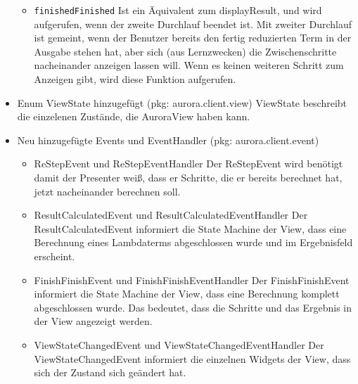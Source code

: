 \documentclass[parskip=full,11pt,twoside]{scrartcl}
\begin{document}
\begin{itemize}
\begin{itemize}
            \item \texttt{finishedFinished} Ist ein Äquivalent zum displayResult, und wird aufgerufen, wenn der zweite Durchlauf beendet ist. Mit zweiter Durchlauf ist gemeint, wenn der Benutzer bereits den fertig reduzierten Term in der Ausgabe stehen hat, aber sich (aus Lernzwecken) die Zwischenschritte nacheinander anzeigen lassen will. Wenn es keinen weiteren Schritt zum Anzeigen gibt, wird diese Funktion aufgerufen.
    	\end{itemize}
    	 \item Enum ViewState hinzugefügt (pkg: aurora.client.view)
    \newline
    ViewState beschreibt die einzelenen Zustände, die AuroraView haben kann.

    \item Neu hinzugefügte Events und EventHandler (pkg: aurora.client.event)
	\begin{itemize}
    		\item ReStepEvent und ReStepEventHandler
    		\newline
    		Der ReStepEvent wird benötigt damit der Presenter weiß, dass er Schritte, die er bereits berechnet hat, jetzt nacheinander berechnen soll.

    		\item ResultCalculatedEvent und ResultCalculatedEventHandler
    		\newline
    		Der ResultCalculatedEvent informiert die State Machine der View, dass eine Berechnung eines Lambdaterms abgeschlossen wurde und im Ergebnisfeld erscheint.

    		\item FinishFinishEvent und FinishFinishEventHandler
    		\newline
    		Der FinishFinishEvent informiert die State Machine der View, dass eine Berechnung komplett abgeschlossen wurde. Das bedeutet, dass die Schritte und das Ergebnis in der View angezeigt werden.

    		\item ViewStateChangedEvent und ViewStateChangedEventHandler
    		\newline
    		Der ViewStateChangedEvent informiert die einzelnen Widgets der View, dass sich der Zustand sich geändert hat.

    	\end{itemize}

\end{itemize}
\end{document}
